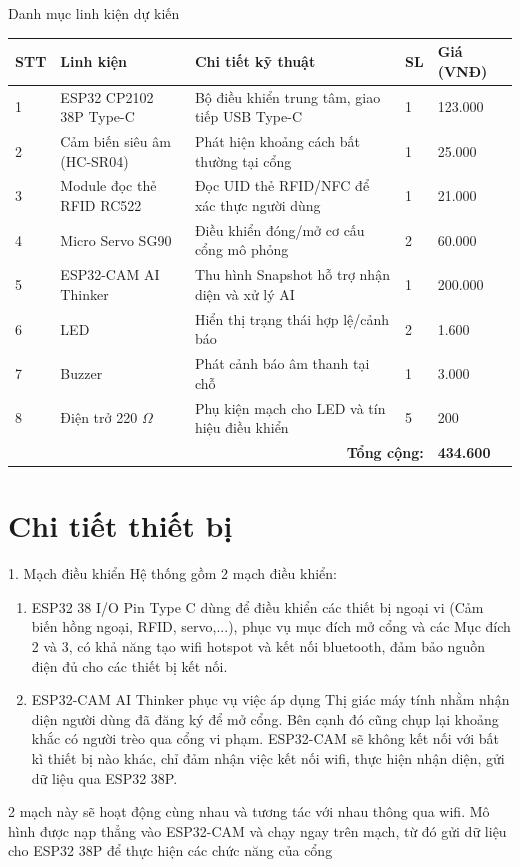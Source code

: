 \documentclass[aspectratio=169]{beamer}
\begin{document}
\begin{frame}{Danh mục linh kiện dự kiến}
  \scriptsize
  \renewcommand{\arraystretch}{1.2}
  \begin{tabular}{p{0.35cm}p{2.45cm}p{5.9cm}p{0.75cm}p{1.35cm}}
    \toprule
    \textbf{STT} & \textbf{Linh kiện} & \textbf{Chi tiết kỹ thuật} & \textbf{SL} & \textbf{Giá (VNĐ)} \\
    \midrule
    1 & ESP32 CP2102 38P Type-C & Bộ điều khiển trung tâm, giao tiếp USB Type-C & 1 & 123.000 \\
    2 & Cảm biến siêu âm (HC-SR04) & Phát hiện khoảng cách bất thường tại cổng & 1 & 25.000 \\
    3 & Module đọc thẻ RFID RC522 & Đọc UID thẻ RFID/NFC để xác thực người dùng & 1 & 21.000 \\
    4 & Micro Servo SG90 & Điều khiển đóng/mở cơ cấu cổng mô phỏng & 2 & 60.000 \\
    5 & ESP32-CAM AI Thinker & Thu hình Snapshot hỗ trợ nhận diện và xử lý AI & 1 & 200.000 \\
    6 & LED & Hiển thị trạng thái hợp lệ/cảnh báo & 2 & 1.600 \\
    7 & Buzzer & Phát cảnh báo âm thanh tại chỗ & 1 & 3.000 \\
    8 & Điện trở 220 $\Omega$ & Phụ kiện mạch cho LED và tín hiệu điều khiển & 5 & 200 \\
    \midrule
    \multicolumn{4}{r}{\textbf{Tổng cộng:}} & \textbf{434.600} \\
    \bottomrule
  \end{tabular}
\end{frame}


\section{Chi tiết thiết bị}
\begin{frame}{1. Mạch điều khiển}
  Hệ thống gồm 2 mạch điều khiển: 
  \begin{enumerate}
    \item ESP32 38 I/O Pin Type C dùng để điều khiển các thiết bị ngoại vi (Cảm biến hồng ngoại, RFID, servo,...), phục vụ mục đích mở cổng và các Mục đích 2 và 3, có khả năng tạo wifi hotspot và kết nối bluetooth, đảm bảo nguồn điện đủ cho các thiết bị kết nối.
    \item ESP32-CAM AI Thinker phục vụ việc áp dụng Thị giác máy tính nhằm nhận diện người dùng đã đăng ký để mở cổng. Bên cạnh đó cũng chụp lại khoảng khắc có người trèo qua cổng vi phạm. ESP32-CAM sẽ không kết nối với bất kì thiết bị nào khác, chỉ đảm nhận việc kết nối wifi, thực hiện nhận diện, gửi dữ liệu qua ESP32 38P.
  \end{enumerate}

  2 mạch này sẽ hoạt động cùng nhau và tương tác với nhau thông qua wifi. Mô hình được nạp thẳng vào ESP32-CAM và chạy ngay trên mạch, từ đó gửi dữ liệu cho ESP32 38P để thực hiện các chức năng của cổng


\end{frame}
\end{document}
